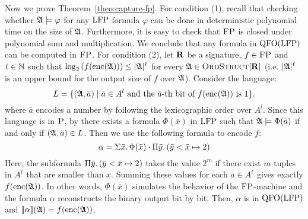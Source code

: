 Now we prove Theorem~\ref{theo:capture-fp}. For condition (1), recall that checking whether $\mathfrak{A}\models\varphi$ for any ${\rm LFP}$ formula $\varphi$ can be done in deterministic polynomial time on the size of $\mathfrak{A}$\cite{I83}. 
Furthermore, it is easy to check that $\text{\sc FP}$ is closed under polynomial sum and multiplication. 
We conclude that any formula in ${\rm QFO}({\rm LFP})$ can be computed in $\text{\sc FP}$.	
For condition (2), let $\mathbf{R}$ be a signature, $f\in \text{\sc FP}$
and $\ell\in\mathbb{N}$ such that $\log_2\left(f({\rm enc}(\mathfrak{A})) \right) \leq \vert \mathfrak{A} \vert^\ell$ for every $\mathfrak{A}\in\text{\sc OrdStruct}[\mathbf{R}]$ (i.e. $\vert \mathfrak{A} \vert^\ell$ is an upper bound for the output size of $f$ over $\mathfrak{A}$).
Consider the language:
\[
L = \{(\mathfrak{A},\bar{a})\mid \bar{a} \in A^l \text{ and the } \bar{a}\text{-th bit of }f({\rm enc}(\mathfrak{A}))\text{ is 1}\}.
\]
where $\bar{a}$ encodes a number by following the lexicographic order over $A^l$.
Since this language is in $\text{\sc P}$, by \cite{I83} there exists a formula $\Phi(\bar{x})$ in ${\rm LFP}$ such that $\mathfrak{A}\models\Phi(\bar{a})$ if and only if $(\mathfrak{A},\bar{a})\in L$. 
Then we use the following formula to encode $f$:
$$
\alpha = \Sigma{\bar{x}}.\, \Phi(\bar{x})\cdot \Pi{\bar{y}}.\,(\bar{y} < \bar{x} \mapsto 2)
$$
Here, the subformula $\Pi{\bar{y}}.\,(\bar{y} < \bar{x} \mapsto 2)$ takes the value $2^m$ if there exist $m$ tuples in $A^{\ell}$ that are smaller than $\bar{x}$. Summing these values for each $\bar{a}\in A^{\ell}$ gives exactly $f({\rm enc}(\mathfrak{A}))$. 
In other words, $\Phi(\bar{x})$ simulates the behavior of the $\text{\sc FP}$-machine and the formula $\alpha$ reconstructs the binary output bit by bit.
Then, $\alpha$ is in ${\rm QFO}({\rm LFP})$ and ${\llbracket{}{\alpha}\rrbracket}(\mathfrak{A}) = f({\rm enc}(\mathfrak{A}))$.
